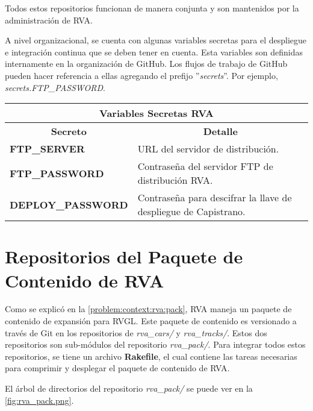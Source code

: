 Todos estos repositorios funcionan de manera conjunta y son mantenidos por la administración de RVA.

A nivel organizacional, se cuenta con algunas variables secretas para el despliegue e integración continua que se deben tener en cuenta. Esta variables son definidas internamente en la organización de GitHub. Los flujos de trabajo de GitHub pueden hacer referencia a ellas agregando el prefijo ''\textit{secrets}''. Por ejemplo, \textit{secrets.FTP\_PASSWORD}.

\begin{center}
  \begin{tabular}{ | p{5cm} | p{10cm}| }
    \hline
    \multicolumn{2}{|c|}{\textbf{Variables Secretas RVA}} \\
    \hline
    \multicolumn{1}{|c|}{\textbf{Secreto}} & \multicolumn{1}{|c|}{\textbf{Detalle}} \\
    \hline
    {\textbf{FTP\_SERVER}} & URL del servidor de distribución. \\ \hline
    
    {\textbf{FTP\_PASSWORD}} & Contraseña del servidor FTP de distribución RVA. \\ \hline
    
    {\textbf{DEPLOY\_PASSWORD}} & Contraseña para descifrar la llave de despliegue de Capistrano. \\
    
    \hline
  \end{tabular}
  \label{table:rva:secrets}
\end{center}

\newpage

\section{Repositorios del Paquete de Contenido de RVA}
Como se explicó en la \autoref{problem:context:rva:pack}, RVA maneja un paquete de contenido de expansión para RVGL. Este paquete de contenido es versionado a través de Git en los repositorios de \textit{rva\_cars/} y \textit{rva\_tracks/}. Estos dos repositorios son sub-módulos del repositorio \textit{rva\_pack/}. Para integrar todos estos repositorios, se tiene un archivo \textbf{Rakefile}, el cual contiene las tareas necesarias para comprimir y desplegar el paquete de contenido de RVA.

El árbol de directorios del repositorio \textit{rva\_pack/} se puede ver en la \autoref{fig:rva_pack.png}.

